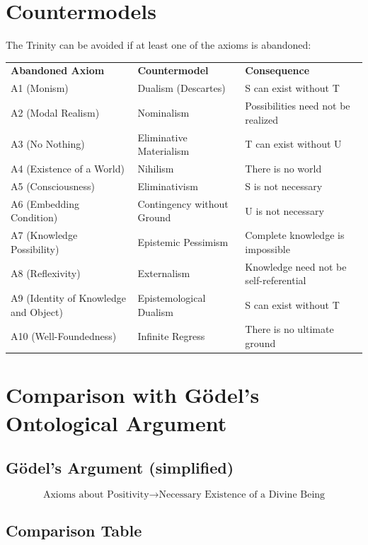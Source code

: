 \documentclass[
]{article}
\begin{document}
\section{Countermodels}\label{countermodels}

The Trinity can be avoided if at least one of the axioms is abandoned:

\begin{tabular}{lll}
\textbf{Abandoned Axiom} & \textbf{Countermodel} & \textbf{Consequence} \\
A1 (Monism) & Dualism (Descartes) & S can exist without T \\
A2 (Modal Realism) & Nominalism & Possibilities need not be realized \\
A3 (No Nothing) & Eliminative Materialism & T can exist without U \\
A4 (Existence of a World) & Nihilism & There is no world \\
A5 (Consciousness) & Eliminativism & S is not necessary \\
A6 (Embedding Condition) & Contingency without Ground & U is not necessary \\
A7 (Knowledge Possibility) & Epistemic Pessimism & Complete knowledge is impossible \\
A8 (Reflexivity) & Externalism & Knowledge need not be self-referential \\
A9 (Identity of Knowledge and Object) & Epistemological Dualism & S can exist without T \\
A10 (Well-Foundedness) & Infinite Regress & There is no ultimate ground \\
\end{tabular}

\section{Comparison with Gödel's Ontological Argument}\label{comparison-with-goumldels-ontological-argument}

\subsection{Gödel's Argument (simplified)}\label{goumldels-argument-simplified}

\[
\text{Axioms about Positivity} \rightarrow \text{Necessary Existence of a Divine Being}
\]

\subsection{Comparison Table}\label{comparison-table}
\end{document}
